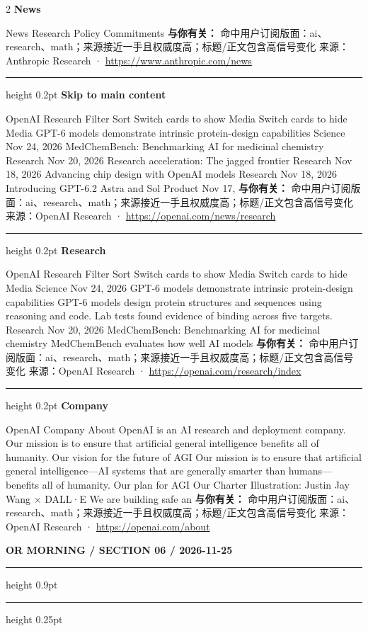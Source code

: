 \documentclass[10.5pt]{ctexart}
\begin{document}
\begin{multicols}{2}
{\large\bfseries News}\par
News Research Policy Commitments
\textbf{与你有关：} 命中用户订阅版面：ai、research、math；来源接近一手且权威度高；标题/正文包含高信号变化
{\footnotesize\color{ormuted} 来源：Anthropic Research · \url{https://www.anthropic.com/news}}
\vspace{2mm}
\hrule height 0.2pt
\vspace{2mm}
{\large\bfseries Skip to main content}\par
OpenAI Research Filter Sort Switch cards to show Media Switch cards to hide Media GPT-6 models demonstrate intrinsic protein-design capabilities Science Nov 24, 2026 MedChemBench: Benchmarking AI for medicinal chemistry Research Nov 20, 2026 Research acceleration: The jagged frontier Research Nov 18, 2026 Advancing chip design with OpenAI models Research Nov 18, 2026 Introducing GPT-6.2 Astra and Sol Product Nov 17, 
\textbf{与你有关：} 命中用户订阅版面：ai、research、math；来源接近一手且权威度高；标题/正文包含高信号变化
{\footnotesize\color{ormuted} 来源：OpenAI Research · \url{https://openai.com/news/research}}
\vspace{2mm}
\hrule height 0.2pt
\vspace{2mm}
{\large\bfseries Research}\par
OpenAI Research Filter Sort Switch cards to show Media Switch cards to hide Media Science Nov 24, 2026 GPT-6 models demonstrate intrinsic protein-design capabilities GPT-6 models design protein structures and sequences using reasoning and code. Lab tests found evidence of binding across five targets. Research Nov 20, 2026 MedChemBench: Benchmarking AI for medicinal chemistry MedChemBench evaluates how well AI models 
\textbf{与你有关：} 命中用户订阅版面：ai、research、math；来源接近一手且权威度高；标题/正文包含高信号变化
{\footnotesize\color{ormuted} 来源：OpenAI Research · \url{https://openai.com/research/index}}
\vspace{2mm}
\hrule height 0.2pt
\vspace{2mm}
{\large\bfseries Company}\par
OpenAI Company About OpenAI is an AI research and deployment company. Our mission is to ensure that artificial general intelligence benefits all of humanity. Our vision for the future of AGI Our mission is to ensure that artificial general intelligence—AI systems that are generally smarter than humans—benefits all of humanity. Our plan for AGI Our Charter Illustration: Justin Jay Wang × DALL·E We are building safe an
\textbf{与你有关：} 命中用户订阅版面：ai、research、math；来源接近一手且权威度高；标题/正文包含高信号变化
{\footnotesize\color{ormuted} 来源：OpenAI Research · \url{https://openai.com/about}}
\end{multicols}
\newpage
{\small\bfseries OR MORNING / SECTION 06 / 2026-11-25}
\vspace{2mm}
\hrule height 0.9pt
\vspace{1.5mm}
\hrule height 0.25pt
\vspace{4mm}
\end{document}

